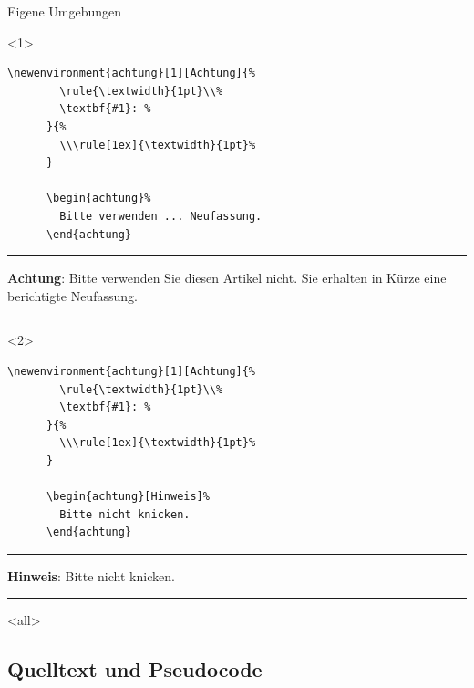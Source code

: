 \begin{Frame}[fragile,t]{Eigene Umgebungen}
  \newenvironment{achtung}[1][Achtung]{%
    \rule{\textwidth}{1pt}\newline%
    \textbf{#1}: %
  }{%
    \newline\rule[1ex]{\textwidth}{1pt}%
  }

  \begin{onlyenv}<1>
    \begin{lstlisting}[gobble=6,morekeywords={[2]achtung}]
      \newenvironment{achtung}[1][Achtung]{%
        \rule{\textwidth}{1pt}\\%
        \textbf{#1}: %
      }{%
        \\\rule[1ex]{\textwidth}{1pt}%
      }

      \begin{achtung}%
        Bitte verwenden ... Neufassung.
      \end{achtung}
    \end{lstlisting}

    \begin{achtung}%
      Bitte verwenden Sie diesen Artikel nicht.
      Sie erhalten in Kürze eine berichtigte Neufassung.
    \end{achtung}
  \end{onlyenv}

  \begin{onlyenv}<2>
    \begin{lstlisting}[gobble=6,morekeywords={[2]achtung}]
      \newenvironment{achtung}[1][Achtung]{%
        \rule{\textwidth}{1pt}\\%
        \textbf{#1}: %
      }{%
        \\\rule[1ex]{\textwidth}{1pt}%
      }

      \begin{achtung}[Hinweis]%
        Bitte nicht knicken.
      \end{achtung}
    \end{lstlisting}

    \begin{achtung}[Hinweis]%
      Bitte nicht knicken.
    \end{achtung}
  \end{onlyenv}
\end{Frame}

\mode
<all>

\subsection{Quelltext und Pseudocode}

